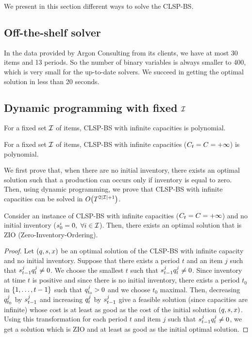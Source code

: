 We present in this section different ways to solve the CLSP-BS.


\subsection{Off-the-shelf solver}


In the data provided by Argon Consulting from its clients, we have at most 30 items and 13 periods.
So the number of binary variables is always smaller to 400, which is very small for the up-to-date solvers.
We succeed in getting the optimal solution in less than 20 seconds.


\subsection{Dynamic programming with fixed $\mathcal{I}$}


For a fixed set $\mathcal{I}$ of items, CLSP-BS with infinite capacities is polynomial.


\begin{thm}\label{thm:complexity:fixed-number-items:infinite-capacity}
For a fixed set $\mathcal{I}$ of items, CLSP-BS with infinite capacities ($C_t=C=+\infty$) is polynomial.
\end{thm}


We first prove that, when there are no initial inventory, there exists an optimal solution such that a production can occurs only if inventory is equal to zero.
Then, using dynamic programming, we prove that CLSP-BS with infinite capacities can be solved in $O\bracket{\horizon^{2\card{\REF}+1}}$.


\begin{lem}\label{lem:complexity:fixed-number-items:infinite-capacity:ZIO}
Consider an instance of CLSP-BS with infinite capacities ($C_t=C=+\infty$) and no initial inventory ($s_0^i=0,\ \forall i\in\mathcal{I}$).
Then, there exists an optimal solution that is ZIO (Zero-Inventory-Ordering).
\end{lem}


\begin{proof}
Let $\bracket{\quantity,\inventory,\setup}$ be an optimal solution of the CLSP-BS with infinite capacity and no initial inventory.
Suppose that there exists a period $t$ and an item $j$ such that $s_{t-1}^jq_t^j\ne0$.
We choose the smallest $t$ such that $s_{t-1}^jq_t^j\ne0$.
Since inventory at time $t$ is positive and since there is no initial inventory, there exists a period $t_0$ in $\range[1]{t-1}$ such that $q_{t_0}^j>0$ and we choose $t_0$ maximal.
Then, decreasing $q_{t_0}^j$ by $s_{t-1}^j$ and increasing $q_t^j$ by $s_{t-1}^j$ give a feasible solution (since capacities are infinite) whose cost is at least as good as the cost of the initial solution $\bracket{\quantity,\inventory,\setup}$.
Using this transformation for each period $t$ and item $j$ such that $s_{t-1}^jq_t^j\ne0$, we get a solution which is ZIO and at least as good as the initial optimal solution.
\end{proof}


